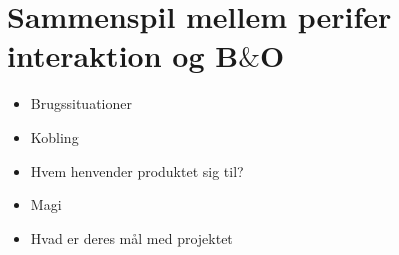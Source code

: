\section{Sammenspil mellem perifer interaktion og B$\&$O}
\label{Sammenspil mellem perifer interaktion og BO}

\begin{itemize}
  \item Brugssituationer 
  \item Kobling
  \item Hvem henvender produktet sig til?
  \item Magi
  \item Hvad er deres mål med projektet
\end{itemize}

